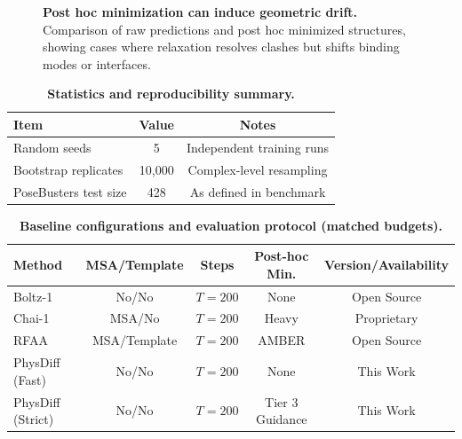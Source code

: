 \documentclass[twocolumn,10pt]{article}
\begin{document}
\begin{figure}[h]
    \centering
    \caption{\textbf{Post hoc minimization can induce geometric drift.}
    Comparison of raw predictions and post hoc minimized structures, showing cases where relaxation resolves clashes but shifts binding modes or interfaces.
    }
    \label{fig:posthoc_drift}
\end{figure}

\begin{table}[h]
\centering
\small
\renewcommand{\arraystretch}{1.2}
\caption{\textbf{Statistics and reproducibility summary.}}
\label{tab:stats}
\begin{tabular}{lcc}
\toprule
\textbf{Item} & \textbf{Value} & \textbf{Notes} \\
\midrule
Random seeds & 5 & Independent training runs \\
Bootstrap replicates & 10{,}000 & Complex-level resampling \\
PoseBusters test size & 428 & As defined in benchmark \\
\bottomrule
\end{tabular}
\end{table}


\begin{table}[h]
\centering
\small
\renewcommand{\arraystretch}{1.2}
\caption{\textbf{Baseline configurations and evaluation protocol (matched budgets).}}
\label{tab:baselines}
\begin{tabular}{lcccc}
\toprule
\textbf{Method} & \textbf{MSA/Template} & \textbf{Steps} & \textbf{Post-hoc Min.} & \textbf{Version/Availability} \\
\midrule
Boltz-1 & No/No & $T=200$ & None & Open Source \\
Chai-1 & MSA/No & $T=200$ & Heavy & Proprietary \\
RFAA & MSA/Template & $T=200$ & AMBER & Open Source \\
PhysDiff (Fast) & No/No & $T=200$ & None & This Work \\
PhysDiff (Strict) & No/No & $T=200$ & Tier 3 Guidance & This Work \\
\bottomrule
\end{tabular}
\end{table}
\end{document}
